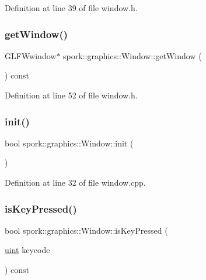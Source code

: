 Definition at line 39 of file window.\+h.

\mbox{\label{classspork_1_1graphics_1_1_window_a56276c9d76c6e05876f427009a877228}} 
\subsubsection{\texorpdfstring{get\+Window()}{getWindow()}}
{\footnotesize\ttfamily G\+L\+F\+Wwindow$\ast$ spork\+::graphics\+::\+Window\+::get\+Window (\begin{DoxyParamCaption}{ }\end{DoxyParamCaption}) const\hspace{0.3cm}{\ttfamily [inline]}}



Definition at line 52 of file window.\+h.

\mbox{\label{classspork_1_1graphics_1_1_window_a63b502f0b800a9e7822fae1d85e0c162}} 
\subsubsection{\texorpdfstring{init()}{init()}}
{\footnotesize\ttfamily bool spork\+::graphics\+::\+Window\+::init (\begin{DoxyParamCaption}{ }\end{DoxyParamCaption})\hspace{0.3cm}{\ttfamily [private]}}



Definition at line 32 of file window.\+cpp.

\mbox{\label{classspork_1_1graphics_1_1_window_af7af1e7167d29623fc59d50eae81f261}} 
\subsubsection{\texorpdfstring{is\+Key\+Pressed()}{isKeyPressed()}}
{\footnotesize\ttfamily bool spork\+::graphics\+::\+Window\+::is\+Key\+Pressed (\begin{DoxyParamCaption}\item[{\hyperlink{defines_8h_a91ad9478d81a7aaf2593e8d9c3d06a14}{uint}}]{keycode }\end{DoxyParamCaption}) const}



